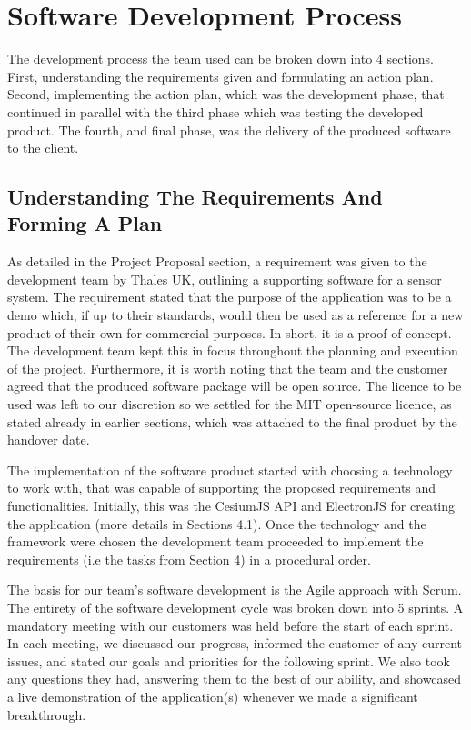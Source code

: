 \documentclass{l3proj}
\begin{document}
\section{Software Development Process}

The development process the team used can be broken down into 4 sections. First, understanding the requirements given and formulating an action plan. Second, implementing the action plan, which was the development phase, that continued in parallel with the third phase which was testing the developed product. The fourth, and final phase, was the delivery of the produced software to the client.

\subsection{Understanding The Requirements And Forming A Plan}

As detailed in the Project Proposal section, a requirement was given to the development team by Thales UK, outlining a supporting software for a sensor system. The requirement stated that the purpose of the application was to be a demo which, if up to their standards, would then be used as a reference for a new product of their own for commercial purposes. In short, it is a proof of concept. The development team kept this in focus throughout the planning and execution of the project. Furthermore, it is worth noting that the team and the customer agreed that the produced software package will be open source. The licence to be used was left to our discretion so we settled for the MIT open-source licence, as stated already in earlier sections, which was attached to the final product by the handover date. 
  
The implementation of the software product started with choosing a technology to work with, that was capable of supporting the proposed requirements and functionalities. Initially, this was the CesiumJS API and ElectronJS for creating the application (more details in Sections 4.1). Once the technology and the framework were chosen the development team proceeded to implement the requirements (i.e the tasks from Section 4) in a procedural order.

The basis for our team’s software development is the Agile\cite{agile} approach with Scrum\cite{scrum}. The entirety of the software development cycle was broken down into 5 sprints. A mandatory meeting with our customers was held before the start of each sprint. In each meeting, we discussed our progress, informed the customer of any current issues, and stated our goals and priorities for the following sprint. We also took any questions they had, answering them to the best of our ability, and showcased a live demonstration of the application(s) whenever we made a significant breakthrough.
 
\end{document}
